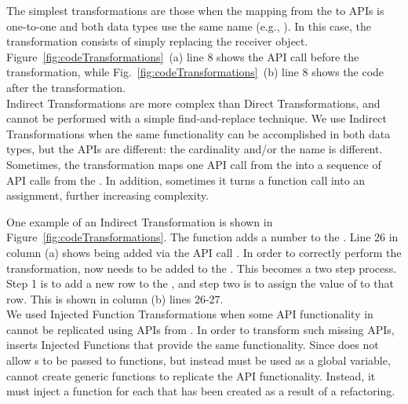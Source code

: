 \documentclass[article]{sigplanconf}
\begin{document}
 The simplest transformations are those when the mapping from the \NC{} to \CDT APIs is one-to-one and both data types use the same name (e.g., ). In this case, the transformation consists of simply replacing the receiver object. 
Figure~\ref{fig:codeTransformations}~(a) line 8 shows the API call before the transformation, while Fig.~\ref{fig:codeTransformations}~(b) line 
8 shows the code after the transformation.\\

Indirect Transformations are more complex than Direct Transformations, and cannot be performed with a simple find-and-replace technique. We use Indirect Transformations when the same functionality can be accomplished in both data types, but the APIs are different: the cardinality and/or the name is different. Sometimes, the transformation maps one API call from the \NC{} into a sequence of API calls from the \CDT{}. In addition, sometimes it turns a function call into an assignment, further increasing complexity.

One example of an Indirect Transformation is shown in Figure~\ref{fig:codeTransformations}. 
The function  adds a number to the  \NC{}. Line 26 in column (a) shows  being added via the API call .
In order to correctly perform the transformation,  now needs to be added to the  .
This becomes a two step process. Step 1 is to add a new row to the \CDT, and step two is to assign the value of  to that row. This is shown in column (b) lines 26-27. \\


We used Injected Function Transformations when some API functionality in \NC{} cannot be replicated using APIs from \CDT{}.
In order to transform such missing APIs, \tool inserts Injected Functions that provide the same functionality.  
Since \TD does not allow \CDT{}s to be passed to functions, but instead must be used as a global variable, \tool cannot create generic functions to replicate the API functionality.  
Instead, it must inject a function for each \CDT that has been created as a result of a refactoring. 
\end{document}
